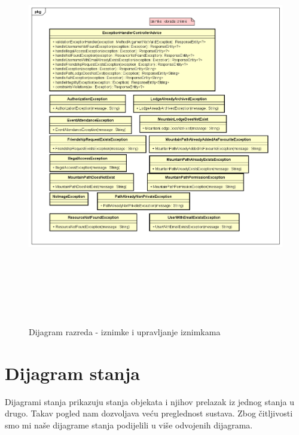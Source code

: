 		\begin{figure}[H]
			\includegraphics[scale=0.6, height=175mm, width=165mm]{dijagrami/iznimke-dijagram.png} %
			\centering
			\caption{Dijagram razreda - iznimke i upravljanje iznimkama}
			\label{fig:dijagrami_razreda5}
		\end{figure}
			
			\eject
			
			
			
			
			\eject
		
		\section{Dijagram stanja}
			
		
			Dijagrami stanja prikazuju stanja objekata i njihov prelazak iz jednog stanja u drugo. Takav pogled nam dozvoljava veću preglednost sustava. Zbog čitljivosti smo mi naše dijagrame stanja podijelili u više odvojenih dijagrama. 
			
